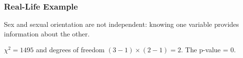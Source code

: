 \documentclass[handout]{beamer}
\newcommand{\blue}[1]{\textcolor{blue2}{#1}}
\begin{document}
\begin{frame}
\frametitle{Real-Life Example}

Sex and sexual orientation are \blue{not independent}:  knowing one variable provides information about the other. 

\vspace{0.5cm}

\pause $\chi^2=1495$ and degrees of freedom $(3-1)\times(2-1) =2$.  The p-value = 0.

\end{frame}
\end{document}

